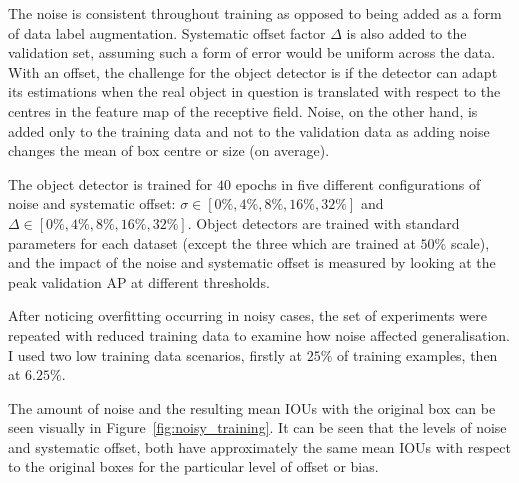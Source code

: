 The noise is consistent throughout training as opposed to being added as a form of data label augmentation. Systematic offset factor $\Delta$ is also added to the validation set, assuming such a form of error would be uniform across the data. With an offset, the challenge for the object detector is if the detector can adapt its estimations when the real object in question is translated with respect to the centres in the feature map of the receptive field. Noise, on the other hand, is added only to the training data and not to the validation data as adding noise changes the mean of box centre or size (on average).

The object detector is trained for $40$ epochs in five different configurations of noise and systematic offset: $\sigma \in [0\%, 4\%, 8\%, 16\%, 32\%]$ and $\Delta \in [0\%, 4\%, 8\%, 16\%, 32\%]$. Object detectors are trained with standard parameters for each dataset (except the three which are trained at $50\%$ scale), and the impact of the noise and systematic offset is measured by looking at the peak validation \gls{AP} at different thresholds.

After noticing overfitting occurring in noisy cases, the set of experiments were repeated with reduced training data to examine how noise affected generalisation. I used two low training data scenarios, firstly at $25\%$ of training examples, then at $6.25\%$.

The amount of noise and the resulting mean \gls{IOU}s with the original box can be seen visually in Figure~\ref{fig:noisy_training}. It can be seen that the levels of noise and systematic offset, both have approximately the same mean \gls{IOU}s with respect to the original boxes for the particular level of offset or bias.

